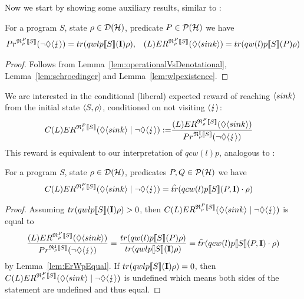 \documentclass[a4paper,UKenglish,cleveref, autoref, thm-restate]{lipics-v2021}
\begin{document}
Now we start by showing some auxiliary results, similar to \cite[Lemma 5.5, 5.6]{conditioningProb}:
\begin{lemma}
    \label{lem:ErWpEqual}
    For a program $S$, state $\rho\in \mathcal{D}(\mathcal{H})$, predicate $P\in\mathcal{P}(\mathcal{H})$ we have
    \begin{align*}
        Pr^{\mathfrak{R}_{\rho}^{P}\llbracket S \rrbracket}(\neg \lozenge \langle \lightning \rangle) = tr(qwlp\llbracket S \rrbracket (\textbf{I}) \rho), &&
        (L)ER^{\mathfrak{R}_{\rho}^{P}\llbracket S \rrbracket} (\lozenge \langle sink \rangle)= tr(qw(l)p\llbracket S \rrbracket (P) \rho)
\end{align*}
\end{lemma}
\begin{proof}
    Follows from Lemma~\ref{lem:operationalVsDenotational}, Lemma~\ref{lem:schroedinger} and Lemma~\ref{lem:wlpexistence}.\end{proof}
We are interested in the conditional (liberal) expected reward of reaching $\langle sink \rangle$ from the initial state $\langle S , \rho \rangle$, conditioned on not visiting $\langle \lightning \rangle$:
\begin{align*}
    C(L)ER^{\mathfrak{R}_{\rho}^{P}\llbracket S \rrbracket} (\lozenge \langle sink \rangle \mid \neg \lozenge \langle \lightning \rangle):=& \frac{(L)ER^{\mathfrak{R}_{\rho}^{P}\llbracket S \rrbracket} (\lozenge \langle sink \rangle)}{Pr^{\mathfrak{R}_{\rho}^{\textbf{I}}\llbracket S \rrbracket}(\neg \lozenge \langle \lightning \rangle)}
\end{align*}
This reward is equivalent to our interpretation of $qcw(l)p$, analogous to \cite[Theorem 5.7]{conditioningProb}:
\begin{theorem} \label{th:correspondenceMcCqwp}
    For a program $S$, state $\rho\in \mathcal{D}(\mathcal{H})$, predicates $P,Q\in\mathcal{P}(\mathcal{H})$ we have
    \begin{align*}
        C(L)ER^{\mathfrak{R}_{\rho}^{P}\llbracket S \rrbracket} (\lozenge \langle sink \rangle \mid \neg \lozenge \langle \lightning \rangle) &= \hat{tr}( qcw(l)p\llbracket S \rrbracket (P,\textbf{I}) \cdot \rho)
\end{align*}
\end{theorem}
\begin{proof}
    Assuming $tr(qwlp\llbracket S \rrbracket (\textbf{I}) \rho) >0$, then $C(L)ER^{\mathfrak{R}_{\rho}^{P}\llbracket S \rrbracket} (\lozenge \langle sink \rangle \mid \neg \lozenge \langle \lightning \rangle)$ is equal to
    \begin{align*}
        \frac{(L)ER^{\mathfrak{R}_{\rho}^{P}\llbracket S \rrbracket} (\lozenge \langle sink \rangle)}{Pr^{\mathfrak{R}_{\rho}^{\textbf{I}}\llbracket S \rrbracket}(\neg \lozenge \langle \lightning \rangle)} = \frac{tr(qw(l)p \llbracket S \rrbracket (P) \rho)}{tr(qwlp\llbracket S \rrbracket (\textbf{I}) \rho)} = \hat{tr}(qcw(l)p\llbracket S \rrbracket (P,\textbf{I}) \cdot \rho)
    \end{align*}
    by Lemma~\ref{lem:ErWpEqual}.
    If $tr(qwlp\llbracket S \rrbracket (\textbf{I}) \rho)=0$, then $C(L)ER^{\mathfrak{R}_{\rho}^{P}\llbracket S \rrbracket} (\lozenge \langle sink \rangle \mid \neg \lozenge \langle \lightning \rangle)$ is undefined which means both sides of the statement are undefined and thus equal.
\end{proof}
\end{document}
